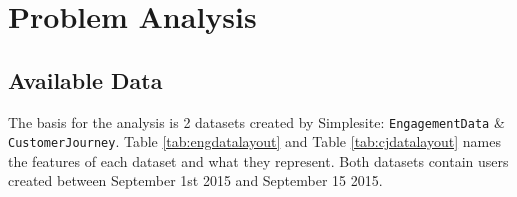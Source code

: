 \section{Problem Analysis}


\subsection{Available Data}

The basis for the analysis is 2 datasets created by Simplesite:
\texttt{EngagementData} \& \texttt{CustomerJourney}. Table
\ref{tab:engdatalayout} and Table \ref{tab:cjdatalayout} names the features of
each dataset and what they represent. Both datasets contain users created
between September 1st 2015 and September 15 2015. 

